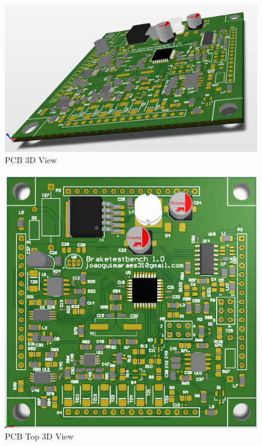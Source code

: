 		\begin{figure}[htbp]
			\centering
			\includegraphics[scale=0.65]{figuras/fig-pcb-print-diagonal.png}
			\caption{PCB 3D View \cite{pcb-print-diagonal}}
			\label{fig:pcb-print-diagonal}
		\end{figure}

		\begin{figure}[htbp]
			\centering
			\includegraphics[scale=0.7]{figuras/fig-pcb-print-top.png}
			\caption{PCB Top 3D View \cite{pcb-print-top}}
			\label{fig:pcb-print-top}
		\end{figure}

